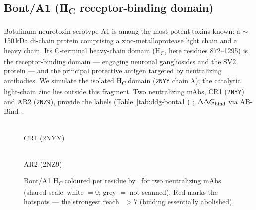 \subsection{Bont/A1 (H\textsubscript{C} receptor-binding domain)}
Botulinum neurotoxin serotype A1 is among the most potent toxins known: a $\sim$150\,kDa di-chain
protein comprising a zinc-metalloprotease light chain and a heavy chain. Its C-terminal
heavy-chain domain (H\textsubscript{C}, here residues 872--1295) is the receptor-binding domain
--- engaging neuronal gangliosides and the SV2 protein --- and the principal protective antigen
targeted by neutralizing antibodies. We simulate the isolated H\textsubscript{C} domain
(\texttt{2NYY} chain A); the catalytic light-chain zinc lies outside this fragment. Two
neutralizing mAbs, CR1 (\texttt{2NYY}) and AR2 (\texttt{2NZ9}), provide the labels
(Table~\ref{tab:ddg-bonta1})~\cite{garciarodriguez2007}; $\Delta\Delta G_{\mathrm{bind}}$ via AB-Bind~\cite{sirin2016}.
\begin{figure}[H]\centering
\begin{minipage}[c]{0.37\linewidth}\centering{}\\[-2pt]{\small CR1 (2NYY)}\end{minipage}\hfill
\begin{minipage}[c]{0.37\linewidth}\centering{}\\[-2pt]{\small AR2 (2NZ9)}\end{minipage}\hfill
\begin{minipage}[c]{0.13\linewidth}\centering{}\end{minipage}
\caption{Bont/A1 H\textsubscript{C} coloured per residue by \ddG\ for two neutralizing mAbs (shared scale, white $=0$; grey $=$ not scanned). Red marks the hotspots --- the strongest reach \ddG\ $>7$ (binding essentially abolished).}\end{figure}


